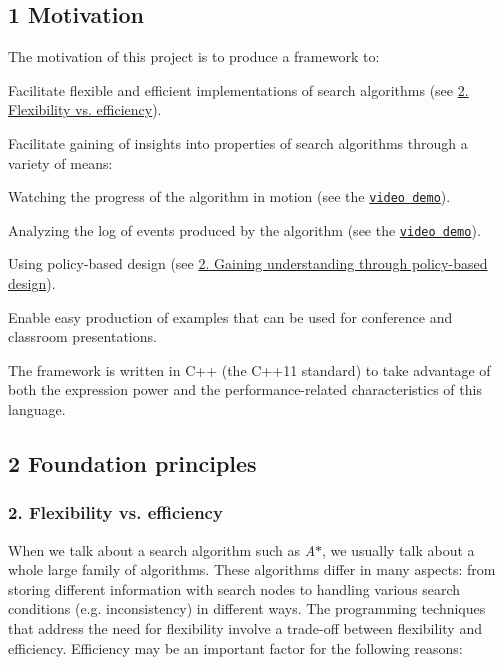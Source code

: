 \hypertarget{index_s-motivation}{}\subsection{1 Motivation}\label{index_s-motivation}
The motivation of this project is to produce a framework to\+:


\begin{DoxyItemize}
\item Facilitate flexible and efficient implementations of search algorithms (see \hyperlink{index_s-flexibility-efficiency}{2. Flexibility vs. efficiency}).
\item Facilitate gaining of insights into properties of search algorithms through a variety of means\+:
\begin{DoxyItemize}
\item Watching the progress of the algorithm in motion (see the \href{https://youtu.be/cElxLWve1Zw}{\tt video demo}).
\item Analyzing the log of events produced by the algorithm (see the \href{https://youtu.be/cElxLWve1Zw}{\tt video demo}).
\item Using policy-\/based design (see \hyperlink{index_s-policy}{2. Gaining understanding through policy-\/based design}).
\end{DoxyItemize}
\item Enable easy production of examples that can be used for conference and classroom presentations.
\end{DoxyItemize}

The framework is written in {\ttfamily C++} (the {\ttfamily C++11} standard) to take advantage of both the expression power and the performance-\/related characteristics of this language.\hypertarget{index_s-principles}{}\subsection{2 Foundation principles}\label{index_s-principles}
\hypertarget{index_s-flexibility-efficiency}{}\subsubsection{2. Flexibility vs. efficiency}\label{index_s-flexibility-efficiency}
When we talk about a search algorithm such as {\itshape A$\ast$}, we usually talk about a whole large family of algorithms. These algorithms differ in many aspects\+: from storing different information with search nodes to handling various search conditions (e.\+g. inconsistency) in different ways. The programming techniques that address the need for flexibility involve a trade-\/off between flexibility and efficiency. Efficiency may be an important factor for the following reasons\+:


